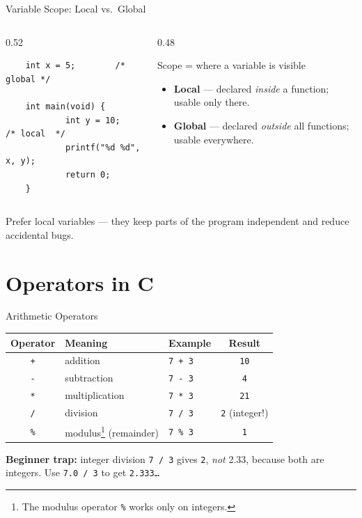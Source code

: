 \documentclass[aspectratio=169]{beamer}
\begin{document}
	\begin{frame}[fragile]{Variable Scope: Local vs.\ Global}
		\begin{columns}[T]
			\begin{column}{0.52\textwidth}
\begin{lstlisting}
	int x = 5;        /* global */
	
	int main(void) {
			int y = 10;   /* local  */
			printf("%d %d", x, y);
			return 0;
	}
\end{lstlisting}
			\end{column}
			\begin{column}{0.48\textwidth}
				\begin{block}{Scope = where a variable is visible}
					\small
					\begin{itemize}
						\item \textbf{Local} --- declared \emph{inside} a function; usable only there.
						\item \textbf{Global} --- declared \emph{outside} all functions; usable everywhere.
					\end{itemize}
				\end{block}
				
			\end{column}
		\end{columns}
		\vspace*{1cm}
		\footnotesize Prefer local variables --- they keep parts of the program independent and reduce accidental bugs.
	\end{frame}
	
	\section{Operators in C}
	\begin{frame}{Arithmetic Operators}
		\renewcommand{\arraystretch}{1.35}
		\centering
		\begin{tabular}{@{}cllc@{}}
			\toprule
			\textbf{Operator} & \textbf{Meaning} & \textbf{Example} & \textbf{Result} \\
			\midrule
			\texttt{+} & addition        & \texttt{7 + 3}  & \texttt{10} \\
			\texttt{-} & subtraction     & \texttt{7 - 3}  & \texttt{4}  \\
			\texttt{*} & multiplication  & \texttt{7 * 3}  & \texttt{21} \\
			\texttt{/} & division        & \texttt{7 / 3}  & \texttt{2}  (integer!) \\
			\texttt{\%} & modulus\footnote{The modulus operator \texttt{\%} works only on integers.} (remainder) & \texttt{7 \% 3} & \texttt{1} \\
			\bottomrule
		\end{tabular}
		\vspace{0.3cm}
		\begin{block}{\textbf{Beginner trap:} integer division}
			\small \texttt{7 / 3} gives \texttt{2}, \emph{not} 2.33, because both are integers.
			Use \texttt{7.0 / 3} to get \texttt{2.333\ldots}
		\end{block}
	\end{frame}
	
\end{document}
